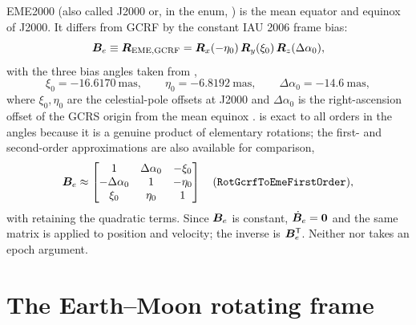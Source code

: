 EME2000 (also called J2000 or, in the enum, ) is the mean equator
and equinox of J2000. It differs from GCRF by the constant IAU 2006 frame
bias:
%
\begin{equation}
  \label{eq:fc-bias}
  \bm{B}_e \equiv \bm{R}_{\mathrm{EME},\mathrm{GCRF}}
  = \bm{R}_x(-\eta_0)\,\bm{R}_y(\xi_0)\,\bm{R}_z(\Delta\alpha_0),
\end{equation}
%
with the three bias angles taken from
,
%
\begin{equation}
  \label{eq:fc-bias-angles}
  \xi_0 = -16.6170\ \mathrm{mas}, \qquad
  \eta_0 = -6.8192\ \mathrm{mas}, \qquad
  \Delta\alpha_0 = -14.6\ \mathrm{mas},
\end{equation}
%
where $\xi_0, \eta_0$ are the celestial-pole offsets at J2000 and
$\Delta\alpha_0$ is the right-ascension offset of the GCRS origin from the
mean equinox \citep{iers2010}.  is exact to all orders in
the angles because it is a genuine product of elementary rotations; the
first- and second-order approximations are also available for comparison,
%
\begin{equation}
  \label{eq:fc-bias-first}
  \bm{B}_e \approx
  \begin{bmatrix}
    1 & \Delta\alpha_0 & -\xi_0 \\
    -\Delta\alpha_0 & 1 & -\eta_0 \\
    \xi_0 & \eta_0 & 1
  \end{bmatrix}
  \quad (\texttt{RotGcrfToEmeFirstOrder}),
\end{equation}
%
with  retaining the quadratic terms. Since
$\bm{B}_e$ is constant, $\dot{\bm{B}}_e = \bm{0}$ and the same matrix is
applied to position and velocity; the inverse is
$\bm{B}_e^{\mathsf{T}}$. Neither  nor  takes an
epoch argument.

\section{The Earth--Moon rotating frame}
\label{sec:fc-emr}

